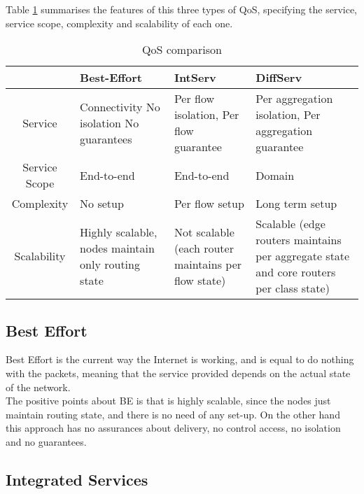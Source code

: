 Table \ref{table:qosComp} summarises the features of this three types of QoS, specifying the service, service scope, complexity and scalability of each one.

\begin{table}[ht] 
\caption{QoS comparison} %
\centering %
\begin{tabular}{c || p{2.5cm} p{3.5cm} p{4.5cm}} %
\hline\hline %
  & Best-Effort & IntServ & DiffServ \\ [0.5ex] %
\hline %
Service & Connectivity No isolation  No guarantees & Per flow isolation, Per flow guarantee & Per aggregation isolation, Per aggregation guarantee \\   \hline %
Service Scope & End-to-end & End-to-end & Domain \\   \hline
Complexity & No setup & Per flow setup & Long term setup \\   \hline
Scalability & Highly scalable, nodes maintain only routing state & Not scalable (each router maintains per flow state) & Scalable (edge routers maintains per aggregate state and core routers per class state) \\ [1ex] %
\hline %
\end{tabular} 
\label{table:qosComp} %
\end{table}


\subsection{Best Effort}
\label{sec:be}

Best Effort is the current way the Internet is working, and is equal to do nothing with the packets, meaning that the service provided depends on the actual state of the network.\\

The positive points about BE is that is highly scalable, since the nodes just maintain routing state, and there is no need of any set-up. On the other hand this approach has no assurances about delivery, no control access, no isolation and no guarantees. 

\subsection{Integrated Services}
\label{sec:intserv}

